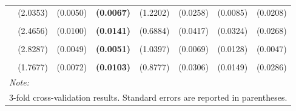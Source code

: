 \documentclass[
  12pt,
]{article}
\begin{document}
\begin{table}[H]
{\begin{tabular}[t]{lll>{}lllll}
 & (2.0353) & (0.0050) & \textbf{(0.0067)} & (1.2202) & (0.0258) & (0.0085) & (0.0208)\\
\addlinespace
\cellcolor{gray!6}{c.bn6} & \cellcolor{gray!6}{-76.6398} & \cellcolor{gray!6}{0.6914} & \textbf{\cellcolor{gray!6}{0.6243}} & \cellcolor{gray!6}{1.1094} & \cellcolor{gray!6}{0.4392} & \cellcolor{gray!6}{0.2960} & \cellcolor{gray!6}{0.2830}\\
 & (2.4656) & (0.0100) & \textbf{(0.0141)} & (0.6884) & (0.0417) & (0.0324) & (0.0268)\\
\addlinespace
\cellcolor{gray!6}{c.stm.r20} & \cellcolor{gray!6}{-70.6443} & \cellcolor{gray!6}{0.6818} & \textbf{\cellcolor{gray!6}{0.6219}} & \cellcolor{gray!6}{2.9958} & \cellcolor{gray!6}{0.4207} & \cellcolor{gray!6}{0.3227} & \cellcolor{gray!6}{0.2813}\\
 & (2.8287) & (0.0049) & \textbf{(0.0051)} & (1.0397) & (0.0069) & (0.0128) & (0.0047)\\
\addlinespace
\cellcolor{gray!6}{c.bn4} & \cellcolor{gray!6}{-94.6995} & \cellcolor{gray!6}{0.6964} & \textbf{\cellcolor{gray!6}{0.6174}} & \cellcolor{gray!6}{1.8741} & \cellcolor{gray!6}{0.3953} & \cellcolor{gray!6}{0.3125} & \cellcolor{gray!6}{0.2549}\\
 & (1.7677) & (0.0072) & \textbf{(0.0103)} & (0.8777) & (0.0306) & (0.0149) & (0.0286)\\
\bottomrule
\multicolumn{8}{l}{\rule{0pt}{1em}\textit{Note: }}\\
\multicolumn{8}{l}{\rule{0pt}{1em}3-fold cross-validation results. Standard errors are reported in parentheses.}\\
\end{tabular}}
\end{table}
\end{document}

